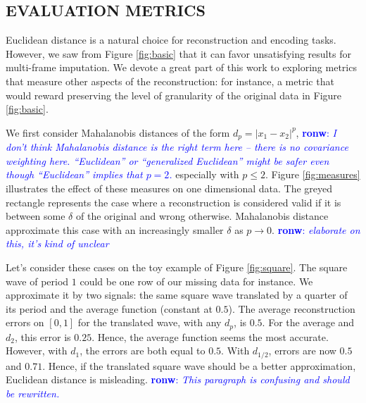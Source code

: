 \documentclass{article}
\newcommand{\FIXME}[2][FIXME]{\textcolor{blue}{\textbf{#1}: \emph{#2}}}
\begin{document}
\subsection{EVALUATION METRICS}
\label{ssec:measures}
Euclidean distance is a natural choice for reconstruction and encoding
tasks. However, we saw from Figure \ref{fig:basic} that it can favor
unsatisfying results for multi-frame imputation. We devote a great
part of this work to exploring metrics that measure other aspects of
the reconstruction: for instance, a metric that would reward
preserving the level of granularity of the original data in Figure
\ref{fig:basic}.

We first consider Mahalanobis distances of the form $d_p =
|x_1-x_2|^p$,
\FIXME[ronw]{I don't think Mahalanobis distance is the right term here
  -- there is no covariance weighting here.  ``Euclidean'' or
  ``generalized Euclidean'' might be
  safer even though ``Euclidean'' implies that $p=2$.}
 especially with $p \leq 2$. Figure \ref{fig:measures}
illustrates the effect of these measures on one dimensional data.  The
greyed rectangle represents the case where a reconstruction is
considered valid if it is between some $\delta$ of the original and
wrong otherwise.  Mahalanobis distance approximate this case with an
increasingly smaller $\delta$ as $p \rightarrow 0$.
\FIXME[ronw]{elaborate on this, it's kind of unclear}

Let's consider these cases on the toy example of Figure
\ref{fig:square}.  The square wave of period $1$ could be one row of
our missing data for instance.  We approximate it by two signals: the
same square wave translated by a quarter of its period and the average
function (constant at $0.5$). The average reconstruction errors on
$[0,1]$ for the translated wave, with any $d_p$, is $0.5$.  For the
average and $d_2$, this error is $0.25$.  Hence, the average function
seems the most accurate. However, with $d_1$, the errors are both
equal to $0.5$. With $d_{1/2}$, errors are now $0.5$ and
$0.71$. Hence, if the translated square wave should be a better
approximation, Euclidean distance is misleading.
\FIXME[ronw]{This paragraph is confusing and should be rewritten.}
\end{document}
